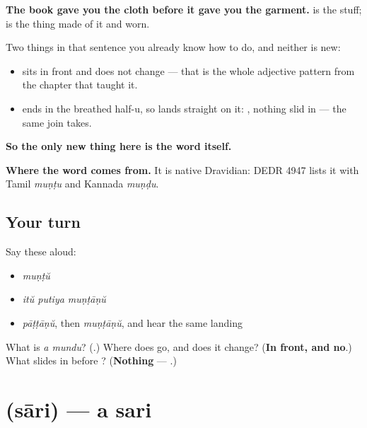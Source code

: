 \begin{cousinweb}
\textbf{The book gave you the cloth before it gave you the garment.} \textbf{} is the stuff; \textbf{} is the thing made of it and worn.

Two things in that sentence you already know how to do, and neither is new:

\begin{itemize}
\raggedright
  \item \textbf{} sits in front and does not change — that is the whole adjective pattern from the chapter that taught it.
  \item \textbf{} ends in the breathed half-u, so \textbf{} lands straight on it: \textbf{}, nothing slid in — the same join \textbf{} takes.
\end{itemize}

\textbf{So the only new thing here is the word itself.}

\textbf{Where the word comes from.} It is native Dravidian: DEDR 4947 lists it with Tamil \emph{muṇṭu} and Kannada \emph{muṇḍu}.
\end{cousinweb}

\subsection*{Your turn}
Say these aloud:

\begin{itemize}
\raggedright
  \item \emph{muṇṭŭ}
  \item \emph{itŭ putiya muṇṭāṇŭ}
  \item \emph{pāṭṭāṇŭ}, then \emph{muṇṭāṇŭ}, and hear the same landing
\end{itemize}

\begin{tcolorbox}[breakable,colback=teal!4,colframe=teal!35!black,title={Before you move on}]
What is \emph{a mundu}? (\textbf{}.) Where does \textbf{} go, and does it change? (\textbf{In front, and no}.) What slides in before \textbf{}? (\textbf{Nothing} — \textbf{}.)
\end{tcolorbox}
\section[\texorpdfstring{\ml{സാരി} (sāri)}{സാരി (sāri)}]{ (sāri) — a sari}

